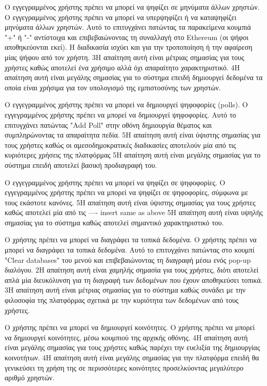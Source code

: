 \begin{enumerate}[label=\textbf{<ΛΑ-\arabic*>}, leftmargin=\parindent, align=left, labelwidth=\parindent, labelsep=0pt]
	\sysReqItem
		{\label{srs:functional-srs-vote-posts}}
		{Ο εγγεγραμμένος χρήστης πρέπει να μπορεί να ψηφίζει σε μηνύματα άλλων χρηστών.}
		{Ο εγγεγραμμένος χρήστης πρέπει να μπορεί να υπερψηφίζει ή να καταψηφίζει μηνύματα άλλων χρηστών. Αυτό το επιτυγχάνει πατώντας τα παρακείμενα κουμπιά "+" ή "-" αντίστοιχα και επιβεβαιώνοντας τη συναλλαγή στο Ethereum (οι ψήφοι αποθηκεύονται εκεί). Η διαδικασία ισχύει και για την τροποποίηση ή την αφαίρεση μίας ψήφου από τον χρήστη.}
		{3}{Η απαίτηση αυτή είναι μέτριας σημασίας για τους χρήστες καθώς αποτελεί ένα χρήσιμο αλλά όχι απαραίτητο χαρακτηριστικό.}
		{4}{Η απαίτηση αυτή είναι μεγάλης σημασίας για το σύστημα επειδή δημιουργεί δεδομένα τα οποία είναι χρήσιμα για τον υπολογισμό της εμπιστοσύνης των χρηστών.}

	\sysReqItem
		{\label{srs:functional-srs-create-polls}}
		{Ο εγγεγραμμένος χρήστης πρέπει να μπορεί να δημιουργεί ψηφοφορίες (polls).}
		{Ο εγγεγραμμένος χρήστης πρέπει να μπορεί να δημιουργεί ψηφοφορίες. Αυτό το επιτυγχάνει πατώντας "Add Poll" στην οθόνη δημιουργία θέματος και συμπληρώνοντας τα απαραίτητα πεδία.}
		{5}{Η απαίτηση αυτή είναι ύψιστης σημασίας για τους χρήστες καθώς οι αμεσοδημοκρατικές διαδικασίες αποτελούν μία από τις κυριότερες χρήσεις της πλατφόρμας}
		{5}{Η απαίτηση αυτή είναι μεγάλης σημασίας για το σύστημα επειδή αποτελεί βασική προδιαγραφή του.}

	\sysReqItem
		{\label{srs:functional-srs-vote-polls}}
		{Ο εγγεγραμμένος χρήστης πρέπει να μπορεί να ψηφίζει σε ψηφοφορίες.}
		{Ο εγγεγραμμένος χρήστης πρέπει να μπορεί να ψηφίζει σε ψηφοφορίες, σύμφωνα με τους εκάστοτε κανόνες.}
		{5}{Η απαίτηση αυτή είναι ύψιστης σημασίας για τους χρήστες καθώς αποτελεί μία από τις ---- insert same as above}
		{5}{Η απαίτηση αυτή είναι υψηλής σημασίας για το σύστημα καθώς αποτελεί σημαντικό χαρακτηριστικό του.}

	\sysReqItem
		{\label{srs:functional-srs-delete-local-data}}
		{Ο χρήστης πρέπει να μπορεί να διαγράφει τα τοπικά δεδομένα.}
		{Ο χρήστης πρέπει να μπορεί να διαγράφει τα τοπικά δεδομένα. Αυτό το επιτυγχάνει πατώντας στο κουμπί "Clear databases" του μενού και επιβεβαιώνοντας τη διαγραφή μέσω ενός pop-up διαλόγου.}
		{2}{Η απαίτηση αυτή είναι χαμηλής σημασία για τους χρήστες, διότι αποτελεί απλά μία διευκόλυνση για τη διαγραφή των δεδομένων που έχουν αποθηκεύσει τοπικά.}
		{3}{Η απαίτηση αυτή είναι μέτριας σημασίας για το σύστημα καθώς συνάδει με την φιλοσοφία της πλατφόρμας σχετικά με την κυριότητα των δεδομένων από τους χρήστες.}

	\sysReqItem
		{\label{srs:functional-srs-create-communities}}
		{Ο χρήστης πρέπει να μπορεί να δημιουργεί κοινότητες.}
		{Ο χρήστης πρέπει να μπορεί να δημιουργεί κοινότητες, μέσω κουμπιού της αρχικής οθόνης.}
		{4}{Η απαίτηση αυτή είναι μεγάλης σημασίας για τους χρήστες καθώς παρέχει την ευελιξία της δημιουργίας κοινοτήτων.}
		{4}{Η απαίτηση αυτή είναι μεγάλης σημασίας για την πλατφόρμα επειδή θα γενικεύσει τη χρήση της σε περισσότερες κοινότητες προσελκύοντας μεγαλύτερο αριθμό χρηστών.}


\end{enumerate}
